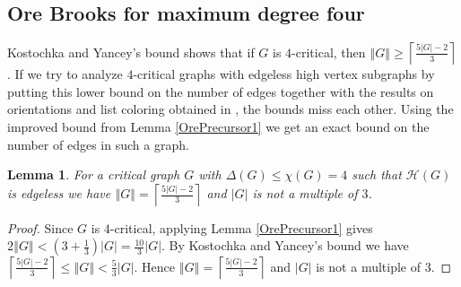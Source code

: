 \documentclass[12pt]{article}
\theoremstyle{plain}
\newtheorem{lem}[thm]{Lemma}
\theoremstyle{definition}
\theoremstyle{remark}
\newcommand{\fancy}[1]{\mathcal{#1}}
\renewcommand{\L}{\fancy{L}}
\newcommand{\HH}{\fancy{H}}
\newcommand{\card}[1]{\left|#1\right|}
\newcommand{\size}[1]{\left\Vert#1\right\Vert}
\newcommand{\ceil}[1]{\left\lceil#1\right\rceil}
\newcommand{\parens}[1]{\left( #1 \right)}
\newcommand{\mic}{\operatorname{mic}}
\begin{document}
\subsection{Ore Brooks for maximum degree four}
Kostochka and Yancey's bound \cite{kostochkayancey2012ore} shows that if $G$ is $4$-critical, then $\size{G} \geq \ceil{\frac{5\card{G}-2}{3}}$.  If we try to analyze $4$-critical graphs with edgeless high vertex subgraphs by putting this lower bound on the number of edges together with the results on orientations and list coloring obtained in \cite{kostochkayancey2012ore}, the bounds miss each other.  Using the improved bound from Lemma \ref{OrePrecursor1} we get an exact bound on the number of edges in such a graph.

\begin{lem}\label{EdgesIn4Critical}
For a critical graph $G$ with $\Delta(G) \leq \chi(G) = 4$ such that $\HH(G)$ is edgeless we have $\size{G} = \ceil{\frac{5\card{G} - 2}{3}}$ and $\card{G}$ is not a multiple of $3$.
\end{lem}
\begin{proof}
Since $G$ is $4$-critical, applying Lemma \ref{OrePrecursor1} gives $2\size{G} < \parens{3 + \frac13}\card{G} = \frac{10}{3}\card{G}$.  By Kostochka and Yancey's bound we have $\ceil{\frac{5\card{G}-2}{3}} \leq \size{G} < \frac{5}{3}\card{G}$.  Hence $\size{G} = \ceil{\frac{5\card{G} - 2}{3}}$ and $\card{G}$ is not a multiple of $3$.
\end{proof}
%
%
\end{document}
